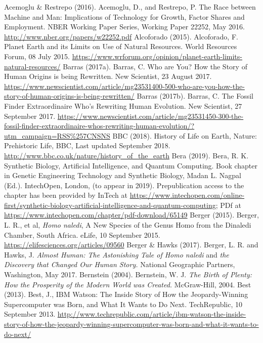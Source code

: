 \begin{multicols}{2}
\newpage

\begin{thebibliography}{99}
 Acemoglu \& Restrepo (2016). Acemoglu, D., and Restrepo, P. The Race between Machine and Man: Implications of Technology for Growth, Factor Shares and Employment. NBER Working Paper Series, Working Paper 22252, May 2016. \url{http://www.nber.org/papers/w22252.pdf}
 Alcoforado (2015). Alcoforado, F. Planet Earth and its Limits on Use of Natural Resources. World Resources Forum, 08 July 2015. \url{https://www.wrforum.org/opinion/planet-earth-limits-natural-resources/}
 Barras (2017a). Barras, C. Who are You? How the Story of Human Origins is being Rewritten. New Scientist, 23 August 2017. \url{https://www.newscientist.com/article/mg23531400-500-who-are-you-how-the-story-of-human-origins-is-being-rewritten/}
 Barras (2017b). Barras, C. The Fossil Finder Extraordinaire Who's Rewriting Human Evolution. New Scientist, 27 September 2017. \url{https://www.newscientist.com/article/mg23531450-300-the-fossil-finder-extraordinaire-whos-rewriting-human-evolution/?utm_campaign=RSS%257CNSNS}
 BBC (2018). History of Life on Earth, Nature: Prehistoric Life, BBC, Last updated September 2018. \url{http://www.bbc.co.uk/nature/history_of_the_earth}
 Bera (2019). Bera, R. K. Synthetic Biology, Artificial Intelligence, and Quantum Computing. Book chapter in Genetic Engineering Technology and Synthetic Biology, Madan L. Nagpal (Ed.). IntechOpen, London, (to appear in 2019). Prepublication access to the chapter has been provided by InTech at
  \url{https://www.intechopen.com/online-first/synthetic-biology-artificial-intelligence-and-quantum-computing}; PDf at \url{https://www.intechopen.com/chapter/pdf-download/65149}
 Berger (2015). Berger, L. R., et al, \textit{Homo naledi}, A New Species of the Genus Homo from the Dinaledi Chamber, South Africa. eLife, 10 September 2015. \url{https://elifesciences.org/articles/09560}
 Berger \& Hawks (2017). Berger, L. R. and Hawks, J. \textit{Almost Human: The Astonishing Tale of Homo naledi} and \textit{the Discovery that Changed Our Human Story.} National Geographic Partners, Washington, May 2017.
 Bernstein (2004). Bernstein, W. J. \textit{The Birth of Plenty: How the Prosperity of the Modern World was Created.} McGraw-Hill, 2004.
 Best (2013). Best, J., IBM Watson: The Inside Story of How the Jeopardy-Winning Supercomputer was Born, and What It Wants to Do Next. TechRepublic, 10 September 2013. \url{http://www.techrepublic.com/article/ibm-watson-the-inside-story-of-how-the-jeopardy-winning-supercomputer-was-born-and-what-it-wants-to-do-next/}

\end{thebibliography}
\end{multicols}
